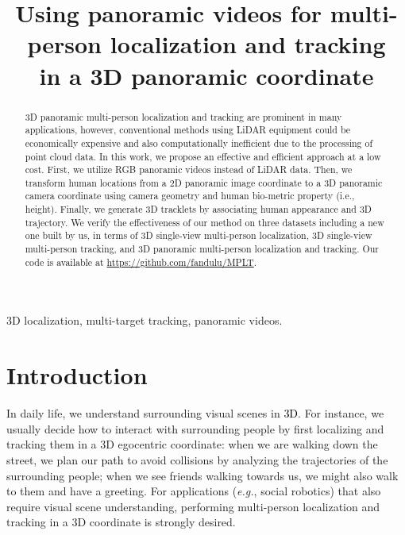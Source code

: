 \documentclass{article}
\title{Using panoramic videos for multi-person localization and tracking \\in a 3D panoramic coordinate}
\newcommand{\eg}{{\it e.g.}}
\newcommand{\YangProof}[1]{\textcolor{black}{#1}}
\begin{document}
\maketitle
\begin{abstract}


3D panoramic multi-person localization and tracking are prominent in many applications, however, conventional methods using LiDAR equipment could be economically expensive and also computationally inefficient due to the processing of point cloud data. In this work, we propose an effective and efficient approach at a low cost. First, we utilize RGB panoramic videos instead of LiDAR data. Then, we transform human locations from a 2D panoramic image coordinate to a 3D panoramic camera coordinate using camera geometry and human bio-metric property (i.e., height). Finally, we generate 3D tracklets by associating human appearance and 3D trajectory. We verify the effectiveness of our method on three datasets including a new one built by us, in terms of 3D single-view multi-person localization, 3D single-view multi-person tracking, and 3D panoramic multi-person localization and tracking. Our code is available at \url{https://github.com/fandulu/MPLT}.






\end{abstract}
\begin{keywords}
3D localization, multi-target tracking, panoramic videos.
\end{keywords}

\vspace{-0.5em}
\section{Introduction}
\label{sec:intro}
\vspace{-0.5em}

In daily life, we understand surrounding visual scenes in \YangProof{3D}.
For instance, we usually decide how to interact with surrounding people by first localizing and tracking them in a 3D egocentric coordinate: when we are walking down the street, we plan our \YangProof{path} to avoid collisions by analyzing the trajectories of the surrounding people; when we see friends walking towards us, we might also walk to them and have a greeting. For applications (\eg, social robotics) that also require visual scene understanding, performing multi-person localization and tracking in a 3D coordinate is strongly desired. 
\end{document}
